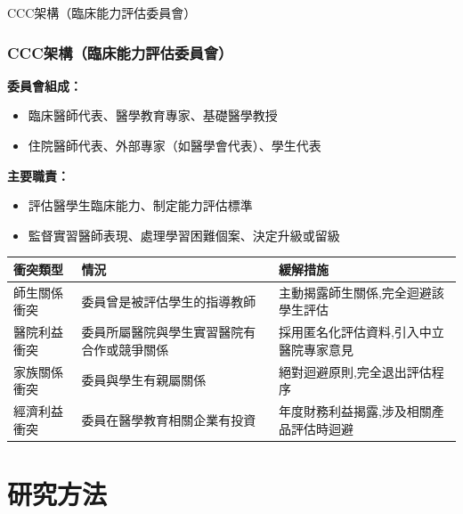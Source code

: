 \documentclass[aspectratio=169]{beamer}
\newcommand{\contentsize}{\fontsize{9pt}{11pt}\selectfont}
\newcommand{\smalltablesize}{\fontsize{6.5pt}{8pt}\selectfont}
\begin{document}
\begin{frame}{CCC架構（臨床能力評估委員會）}
\frametitle{CCC架構（臨床能力評估委員會）}
\contentsize

\textbf{委員會組成：}
\begin{itemize}
    \item 臨床醫師代表、醫學教育專家、基礎醫學教授
    \item 住院醫師代表、外部專家（如醫學會代表）、學生代表
\end{itemize}

\vspace{0.3cm}

\textbf{主要職責：}
\begin{itemize}
    \item 評估醫學生臨床能力、制定能力評估標準
    \item 監督實習醫師表現、處理學習困難個案、決定升級或留級
\end{itemize}

\vspace{0.3cm}

\begin{table}[h]
\centering
\smalltablesize
\begin{tabular}{p{2.3cm}p{2.8cm}p{4.2cm}}
\toprule
\textbf{衝突類型} & \textbf{情況} & \textbf{緩解措施} \\
\midrule
師生關係衝突 & 委員曾是被評估學生的指導教師 & 主動揭露師生關係,完全迴避該學生評估 \\
醫院利益衝突 & 委員所屬醫院與學生實習醫院有合作或競爭關係 & 採用匿名化評估資料,引入中立醫院專家意見 \\
家族關係衝突 & 委員與學生有親屬關係 & 絕對迴避原則,完全退出評估程序 \\
經濟利益衝突 & 委員在醫學教育相關企業有投資 & 年度財務利益揭露,涉及相關產品評估時迴避 \\
\bottomrule
\end{tabular}
\end{table}
\end{frame}

\section{研究方法}
\end{document}

